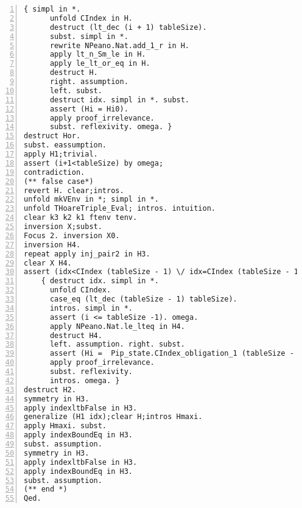 \begin{appendices}
\begin{lstlisting}[xleftmargin=-.1\textwidth,
xrightmargin=-.1\textwidth,
mathescape=true,numbers=left]
    { simpl in *.
      unfold CIndex in H.
      destruct (lt_dec (i + 1) tableSize).
      subst. simpl in *.
      rewrite NPeano.Nat.add_1_r in H.
      apply lt_n_Sm_le in H.
      apply le_lt_or_eq in H.
      destruct H.
      right. assumption.
      left. subst.
      destruct idx. simpl in *. subst. 
      assert (Hi = Hi0).
      apply proof_irrelevance.
      subst. reflexivity. omega. }
destruct Hor.
subst. eassumption.
apply H1;trivial.
assert (i+1<tableSize) by omega;
contradiction.
(** false case*)
revert H. clear;intros.
unfold mkVEnv in *; simpl in *.
unfold THoareTriple_Eval; intros. intuition.
clear k3 k2 k1 ftenv tenv.
inversion X;subst.
Focus 2. inversion X0.
inversion H4.
repeat apply inj_pair2 in H3.
clear X H4.
assert (idx<CIndex (tableSize - 1) \/ idx=CIndex (tableSize - 1)).
    { destruct idx. simpl in *. 
      unfold CIndex.
      case_eq (lt_dec (tableSize - 1) tableSize).
      intros. simpl in *.
      assert (i <= tableSize -1). omega.
      apply NPeano.Nat.le_lteq in H4.
      destruct H4.
      left. assumption. right. subst.
      assert (Hi =  Pip_state.CIndex_obligation_1 (tableSize - 1) l).
      apply proof_irrelevance.
      subst. reflexivity.
      intros. omega. }
destruct H2.
symmetry in H3.
apply indexltbFalse in H3.
generalize (H1 idx);clear H;intros Hmaxi.
apply Hmaxi. subst.
apply indexBoundEq in H3.
subst. assumption. 
symmetry in H3.
apply indexltbFalse in H3.
apply indexBoundEq in H3.
subst. assumption.
(** end *)
Qed.

\end{lstlisting}


\end{appendices}



